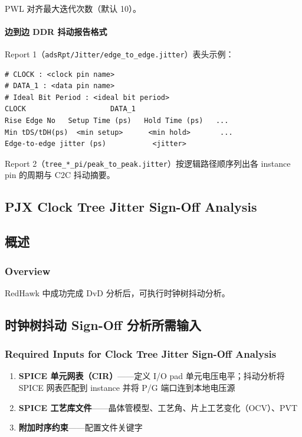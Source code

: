 \paragraph{}
PWL 对齐最大迭代次数（默认 10）。

\paragraph{边到边 DDR 抖动报告格式}
Report 1（\texttt{adsRpt/Jitter/edge\_to\_edge.jitter}）表头示例：
\begin{lstlisting}
# CLOCK : <clock pin name>
# DATA_1 : <data pin name>
# Ideal Bit Period : <ideal bit period>
CLOCK                    DATA_1
Rise Edge No   Setup Time (ps)   Hold Time (ps)   ...
Min tDS/tDH(ps)  <min setup>      <min hold>       ...
Edge-to-edge jitter (ps)           <jitter>
\end{lstlisting}

Report 2（\texttt{tree\_*\_pi/peak\_to\_peak.jitter}）按逻辑路径顺序列出各 instance pin 的周期与 C2C 抖动摘要。

\subsection*{PJX Clock Tree Jitter Sign-Off Analysis}

\subsection{概述}
\subsubsection*{Overview}

RedHawk 中成功完成 DvD 分析后，可执行时钟树抖动分析。

\subsection{时钟树抖动 Sign-Off 分析所需输入}
\subsubsection*{Required Inputs for Clock Tree Jitter Sign-Off Analysis}

\begin{enumerate}
  \item \textbf{SPICE 单元网表（CIR）}——定义 I/O pad 单元电压电平；抖动分析将 SPICE 网表匹配到 instance 并将 P/G 端口连到本地电压源
  \item \textbf{SPICE 工艺库文件}——晶体管模型、工艺角、片上工艺变化（OCV）、PVT
  \item \textbf{附加时序约束}——配置文件关键字 
\end{enumerate}

